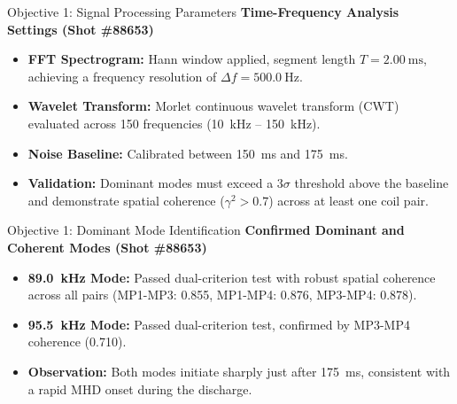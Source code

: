 \documentclass[aspectratio=169]{beamer}
\begin{document}
\begin{frame}{Objective 1: Signal Processing Parameters}
    \textbf{Time-Frequency Analysis Settings (Shot \#88653)}
    \begin{itemize}
        \item \textbf{FFT Spectrogram:} Hann window applied, segment length $T = \SI{2.00}{\milli\second}$, achieving a frequency resolution of $\Delta f = \SI{500.0}{\hertz}$.
        \item \textbf{Wavelet Transform:} Morlet continuous wavelet transform (CWT) evaluated across 150 frequencies (\SI{10}{\kilo\hertz} -- \SI{150}{\kilo\hertz}).
        \item \textbf{Noise Baseline:} Calibrated between \SI{150}{\milli\second} and \SI{175}{\milli\second}.
        \item \textbf{Validation:} Dominant modes must exceed a $3\sigma$ threshold above the baseline and demonstrate spatial coherence ($\gamma^2 > 0.7$) across at least one coil pair.
    \end{itemize}
\end{frame}

\begin{frame}{Objective 1: Dominant Mode Identification}
    \textbf{Confirmed Dominant and Coherent Modes (Shot \#88653)}
    \begin{itemize}
        \item \textbf{\SI{89.0}{\kilo\hertz} Mode:} Passed dual-criterion test with robust spatial coherence across all pairs (MP1-MP3: 0.855, MP1-MP4: 0.876, MP3-MP4: 0.878).
        \item \textbf{\SI{95.5}{\kilo\hertz} Mode:} Passed dual-criterion test, confirmed by MP3-MP4 coherence (0.710).
        \item \textbf{Observation:} Both modes initiate sharply just after \SI{175}{\milli\second}, consistent with a rapid MHD onset during the discharge.
    \end{itemize}
\end{frame}
\end{document}
